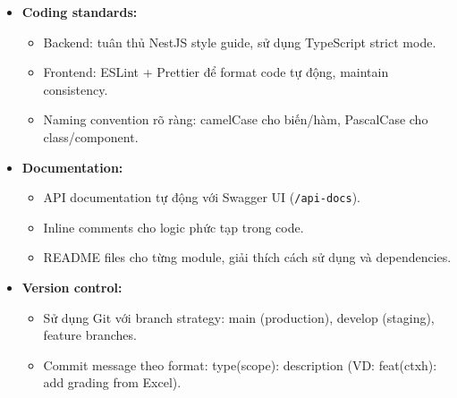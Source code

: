 \begin{itemize}
    \item \textbf{Coding standards:}
    \begin{itemize}
        \item Backend: tuân thủ NestJS style guide, sử dụng TypeScript strict mode.
        \item Frontend: ESLint + Prettier để format code tự động, maintain consistency.
        \item Naming convention rõ ràng: camelCase cho biến/hàm, PascalCase cho class/component.
    \end{itemize}
    
    \item \textbf{Documentation:}
    \begin{itemize}
        \item API documentation tự động với Swagger UI (\texttt{/api-docs}).
        \item Inline comments cho logic phức tạp trong code.
        \item README files cho từng module, giải thích cách sử dụng và dependencies.
    \end{itemize}
    
    \item \textbf{Version control:}
    \begin{itemize}
        \item Sử dụng Git với branch strategy: main (production), develop (staging), feature branches.
        \item Commit message theo format: type(scope): description (VD: feat(ctxh): add grading from Excel).
    \end{itemize}
\end{itemize}
